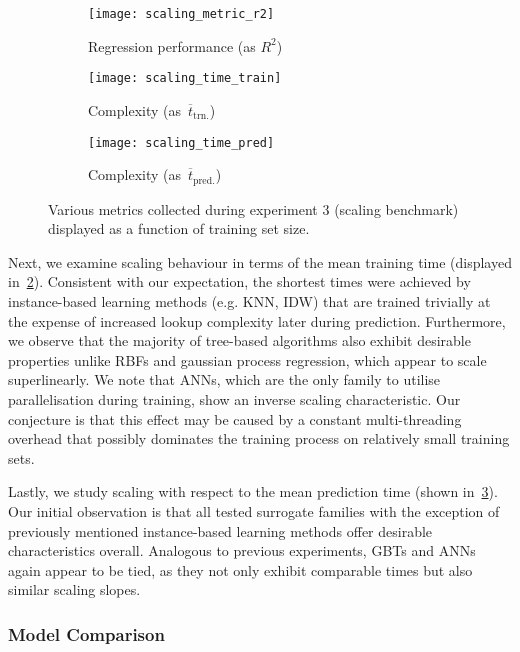 \begin{figure}[h]
	\centering
	\begin{subfigure}[b]{0.333\textwidth}
		\centering
		\texttt{[image: scaling\_metric\_r2]}
		\caption{Regression performance (as $R^2$)}
		\label{fig:scaling-r2}
	\end{subfigure}\hfill%
	\begin{subfigure}[b]{0.333\textwidth}
		\centering
		\texttt{[image: scaling\_time\_train]}
		\caption{Complexity (as~$\overline{t}_{\text{trn.}}$)}
		\label{fig:scaling-trn}
	\end{subfigure}\hfill%
	\begin{subfigure}[b]{0.333\textwidth}
		\centering
		\texttt{[image: scaling\_time\_pred]}
		\caption{Complexity (as~$\overline{t}_{\text{pred.}}$)}
		\label{fig:scaling-pred}
	\end{subfigure}
	\caption{Various metrics collected during experiment 3 (scaling
	benchmark) displayed as a function of training set size.}
	\label{fig:scaling}
\end{figure}

Next, we examine scaling behaviour in terms of the mean training time (displayed
in~\cref{fig:scaling-trn}). Consistent with our expectation, the shortest times
were achieved by instance-based learning methods (e.g. KNN, IDW) that
are trained trivially at the expense of increased lookup complexity later during prediction.
Furthermore, we observe that the majority of tree-based algorithms also exhibit
desirable properties unlike RBFs and gaussian process
regression, which appear to scale superlinearly. We note that ANNs,
which are the only family to utilise parallelisation during training, show an
inverse scaling characteristic. Our conjecture is that this effect may be caused
by a constant multi-threading overhead that possibly dominates the training process
on relatively small training sets.

Lastly, we study scaling with respect to the mean prediction time (shown
in~\cref{fig:scaling-pred}). Our initial observation is that all tested
surrogate families with the exception of previously mentioned instance-based
learning methods offer desirable characteristics overall. Analogous to previous
experiments, GBTs and ANNs again
appear to be tied, as they not only exhibit comparable times but also similar
scaling slopes.


\subsubsection{Model Comparison}

